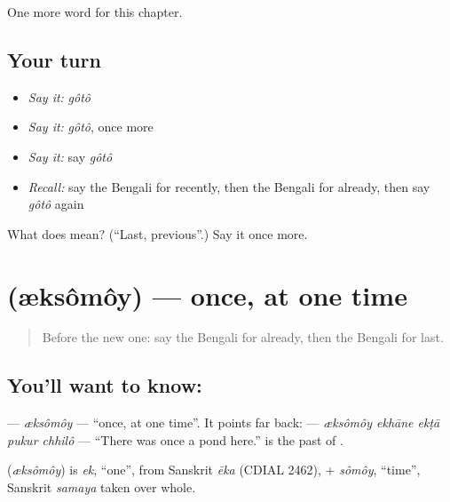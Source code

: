 \begin{grammarlens}[title={What you've built}]
One more word for this chapter.
\end{grammarlens}

\subsection*{Your turn}
\begin{itemize}
\raggedright
  \item \emph{Say it:} \emph{gôtô}
  \item \emph{Say it:} \emph{gôtô}, once more
  \item \emph{Say it:} say \emph{gôtô}
  \item \emph{Recall:} say the Bengali for recently, then the Bengali for already, then say \emph{gôtô} again
\end{itemize}

\begin{tcolorbox}[breakable,colback=teal!4,colframe=teal!35!black,title={Before you move on}]
What does  mean? (\textquotedblleft{}Last, previous\textquotedblright{}.) Say it once more.
\end{tcolorbox}
\section[\texorpdfstring{\bn{একসময়} (æksômôy)}{একসময় (æksômôy)}]{ (æksômôy) — once, at one time}

\label{lesson:BN-C145-ekshomoy}



\begin{quote}
Before the new one: say the Bengali for already, then the Bengali for last.
\end{quote}

\subsection*{You'll want to know: }
\textbf{} — \emph{æksômôy} — \textquotedblleft{}once, at one time\textquotedblright{}. It points far back: \textbf{    } — \emph{æksômôy ekhāne ekṭā pukur chhilô} — \textquotedblleft{}There was once a pond here.\textquotedblright{} \textbf{} is the past of \textbf{}.

\begin{cousinweb}
\textbf{} (\emph{æksômôy}) is \emph{ek}, \textquotedblleft{}one\textquotedblright{}, from Sanskrit \emph{ēka} (CDIAL 2462), + \emph{sômôy}, \textquotedblleft{}time\textquotedblright{}, Sanskrit \emph{samaya} taken over whole.
\end{cousinweb}

